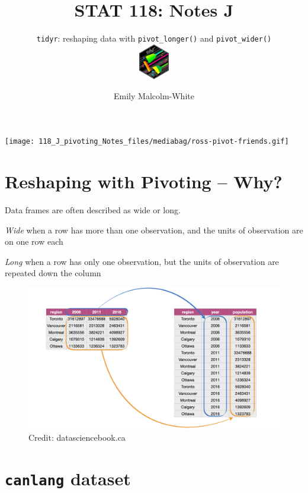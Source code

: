 \documentclass[
  letterpaper,
  DIV=11,
  numbers=noendperiod]{scrartcl}
\title{STAT 118: Notes J}
\subtitle{\texttt{tidyr}: reshaping data with \texttt{pivot\_longer()}
and \texttt{pivot\_wider()}\\
\includegraphics[width=0.1\textwidth,height=\textheight]{118_J_pivoting_Notes_files/mediabag/logo.png}}
\author{Emily Malcolm-White}
\date{}
\begin{document}
\maketitle
\ifdefined\Shaded\renewenvironment{Shaded}{\begin{tcolorbox}[enhanced, frame hidden, breakable, interior hidden, boxrule=0pt, sharp corners, borderline west={3pt}{0pt}{shadecolor}]}{\end{tcolorbox}}\fi

\texttt{[image: 118\_J\_pivoting\_Notes\_files/mediabag/ross-pivot-friends.gif]}

\hypertarget{reshaping-with-pivoting-why}{%
\section{Reshaping with Pivoting --
Why?}\label{reshaping-with-pivoting-why}}

Data frames are often described as wide or long.

\emph{Wide} when a row has more than one observation, and the units of
observation are on one row each

\emph{Long} when a row has only one observation, but the units of
observation are repeated down the column

\begin{figure}

{\centering \includegraphics{118_J_pivoting_Notes_files/mediabag/pivot_functions.001.jpg}

}

\caption{Credit: datasciencebook.ca}

\end{figure}

\hypertarget{canlang-dataset}{%
\section{\texorpdfstring{\texttt{canlang}
dataset}{canlang dataset}}\label{canlang-dataset}}
\end{document}
